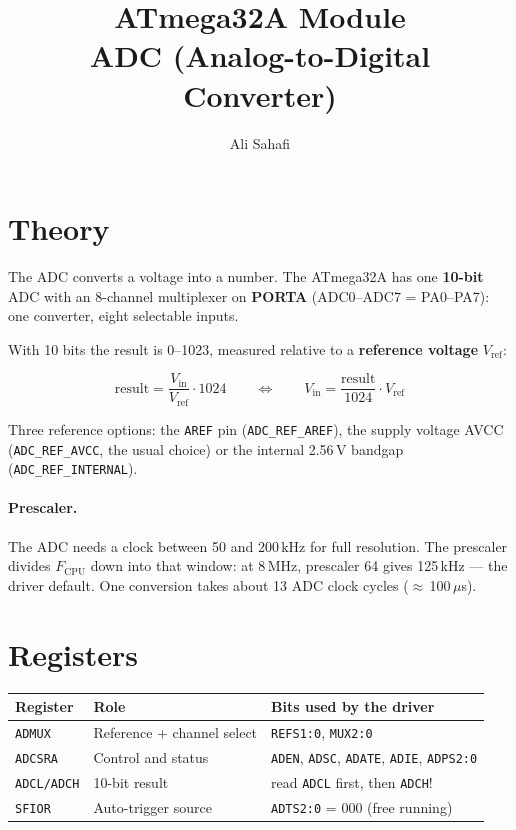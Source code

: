 \documentclass[11pt,a4paper]{article}
\title{ATmega32A Module \\ \Large ADC (Analog-to-Digital Converter)}
\author{Ali Sahafi}
\date{}
\begin{document}
\maketitle

\section{Theory}

The ADC converts a voltage into a number. The ATmega32A has one
\textbf{10-bit} ADC with an 8-channel multiplexer on \textbf{PORTA}
(ADC0--ADC7 = PA0--PA7): one converter, eight selectable inputs.

With 10 bits the result is 0--1023, measured relative to a
\textbf{reference voltage} $V_{\text{ref}}$:

\begin{equation*}
\text{result} = \frac{V_{\text{in}}}{V_{\text{ref}}} \cdot 1024
\qquad\Longleftrightarrow\qquad
V_{\text{in}} = \frac{\text{result}}{1024} \cdot V_{\text{ref}}
\end{equation*}

Three reference options: the \texttt{AREF} pin (\texttt{ADC\_REF\_AREF}),
the supply voltage AVCC (\texttt{ADC\_REF\_AVCC}, the usual choice) or the
internal 2.56\,V bandgap (\texttt{ADC\_REF\_INTERNAL}).

\paragraph{Prescaler.} The ADC needs a clock between 50 and 200\,kHz for full
resolution. The prescaler divides $F_{\text{CPU}}$ down into that window: at
8\,MHz, prescaler 64 gives 125\,kHz --- the driver default. One conversion
takes about 13 ADC clock cycles ($\approx$\,100\,$\mu$s).

\section{Registers}

\begin{center}
\small
\begin{tabular}{lll}
\toprule
\textbf{Register} & \textbf{Role} & \textbf{Bits used by the driver} \\
\midrule
\texttt{ADMUX}  & Reference + channel select & \texttt{REFS1:0}, \texttt{MUX2:0} \\
\texttt{ADCSRA} & Control and status & \texttt{ADEN}, \texttt{ADSC}, \texttt{ADATE}, \texttt{ADIE}, \texttt{ADPS2:0} \\
\texttt{ADCL/ADCH} & 10-bit result & read \texttt{ADCL} first, then \texttt{ADCH}! \\
\texttt{SFIOR}  & Auto-trigger source & \texttt{ADTS2:0} = 000 (free running) \\
\bottomrule
\end{tabular}
\end{center}
\end{document}
